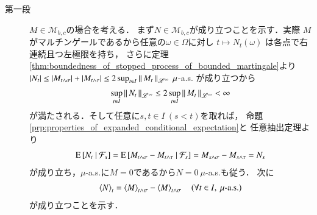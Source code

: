 	\begin{prf}\mbox{}
		\begin{description}
			\item[第一段] $M \in \mathcal{M}_{b,c}$の場合を考える．
				まず$N \in \mathcal{M}_{b,c}$が成り立つことを示す．実際
				$M$がマルチンゲールであるから任意の$\omega \in \Omega$に対し
				$t \longmapsto N_t(\omega)$
				は各点で右連続且つ左極限を持ち，
				さらに定理\ref{thm:boundedness_of_stopped_process_of_bounded_martingale}より
				$|N_t| \leq |M_{t\wedge\sigma}| + |M_{t\wedge\tau}| \leq 2 \sup{t \in I}{\Norm{M_t}{\mathscr{L}^\infty}}\ \mu$-a.s.
				が成り立つから
				\begin{align}
					\operatorname*{sup}_{t \in I} \left\|\, N_t\, \right\|_{\mathscr{L}^\infty}
					\leq 2 \operatorname*{sup}_{t \in I} \left\|\, M_t\, \right\|_{\mathscr{L}^\infty} < \infty
				\end{align}
				が満たされる．そして任意に$s,t \in I\ (s < t)$を取れば，
				命題\ref{prp:properties_of_expanded_conditional_expectation}と
				任意抽出定理より
				\begin{align}
					\operatorname{E} \left[ N_t \ \middle|\ \mathcal{F}_s \right]
					= \operatorname{E} \left[ M_{t \wedge \sigma} - M_{t \wedge \tau} \ \middle|\ \mathcal{F}_s \right]
					= M_{s \wedge \sigma} - M_{s \wedge \tau}
					= N_s
				\end{align}
				が成り立ち，$\mu$-a.s.に$M = 0$であるから$N = 0\ \mu$-a.s.も従う．
				次に
				\begin{align}
					\inprod<N>_t = \inprod<M>_{t \wedge \sigma} - \inprod<M>_{t \wedge \sigma}
					\quad (\forall t \in I,\ \mbox{$\mu$-a.s.})
					\label{eq:lem_stopped_quadratic_variation}
				\end{align}
				が成り立つことを示す．
				

\end{description}
\end{prf}
